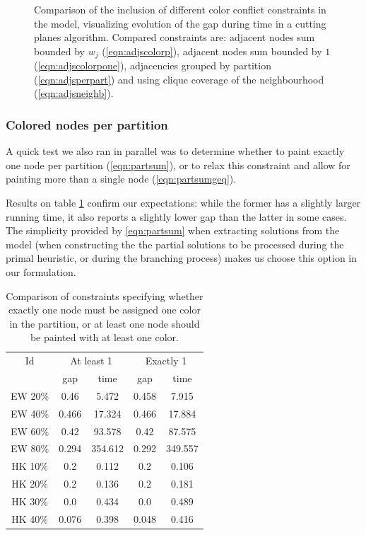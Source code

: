 \begin{figure}
\caption{Comparison of the inclusion of different color conflict constraints in the model, visualizing evolution of the gap during time in a cutting planes algorithm. Compared constraints are: adjacent nodes sum bounded by $w_j$ (\ref{eqn:adjscolorp}), adjacent nodes sum bounded by $1$ (\ref{eqn:adjscolorpone}), adjacencies grouped by partition (\ref{eqn:adjsperpart}) and using clique coverage of the neighbourhood (\ref{eqn:adjsneighb}).}
\label{fig:models:adj}
\end{figure}

\subsubsection{Colored nodes per partition}

A quick test we also ran in parallel was to determine whether to paint exactly one node per partition (\ref{eqn:partsum}), or to relax this constraint and allow for painting more than a single node (\ref{eqn:partsumgeq}). 

Results on table \ref{table:models:partsum} confirm our expectations: while the former has a slightly larger running time, it also reports a slightly lower gap than the latter in some cases. The simplicity provided by \ref{eqn:partsum} when extracting solutions from the model (when constructing the the partial solutions to be processed during the primal heuristic, or during the branching process) makes us choose this option in our formulation.

\begin{table}
\label{table:models:partsum}
\centering

\begin{tabular}{|c|cc|cc|}
\hline
\multicolumn{1}{|c|}{Id} & \multicolumn{2}{|c|}{At least 1} & \multicolumn{2}{|c|}{Exactly 1}
\\
 & gap & time & gap & time
\\
\hline
EW 20\% & 0.46 & 5.472 & 0.458 & 7.915
\\
EW 40\% & 0.466 & 17.324 & 0.466 & 17.884
\\
EW 60\% & 0.42 & 93.578 & 0.42 & 87.575
\\
EW 80\% & 0.294 & 354.612 & 0.292 & 349.557
\\
\hline
HK 10\% &  0.2 & 0.112 &  0.2 & 0.106
\\
HK 20\% &  0.2 & 0.136 &  0.2 & 0.181
\\
HK 30\% &  0.0 & 0.434 &  0.0 & 0.489
\\
HK 40\% & 0.076 & 0.398 & 0.048 & 0.416
\\
\hline 
 \end{tabular}

\caption{Comparison of constraints specifying whether exactly one node must be assigned one color in the partition, or at least one node should be painted with at least one color.}

\end{table}

